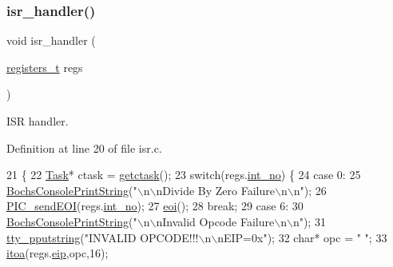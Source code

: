 \subsubsection{\texorpdfstring{isr\+\_\+handler()}{isr\_handler()}}
{\footnotesize\ttfamily void isr\+\_\+handler (\begin{DoxyParamCaption}\item[{\hyperlink{a00134_adf58dbaf6139b4957c348711f2026957_adf58dbaf6139b4957c348711f2026957}{registers\+\_\+t}}]{regs }\end{DoxyParamCaption})}



I\+SR handler. 



Definition at line 20 of file isr.\+c.


\begin{DoxyCode}
21 \{
22     \hyperlink{a00218}{Task}* ctask = \hyperlink{a00083_a5913e9b2190b2b4118ee020721a320e2_a5913e9b2190b2b4118ee020721a320e2}{getctask}();
23     \textcolor{keywordflow}{switch}(regs.\hyperlink{a00254_af311750a9b18afb3b1ed2d144fbe1cb0_af311750a9b18afb3b1ed2d144fbe1cb0}{int\_no}) \{
24         \textcolor{keywordflow}{case} 0:
25             \hyperlink{a00071_a19e1f554d03c977f8b947f21489daa41_a19e1f554d03c977f8b947f21489daa41}{BochsConsolePrintString}(\textcolor{stringliteral}{"\(\backslash\)n\(\backslash\)nDivide By Zero Failure\(\backslash\)n\(\backslash\)n"});
26             \hyperlink{a00044_a1119739f7932598c83c3f8ce42a649de_a1119739f7932598c83c3f8ce42a649de}{PIC\_sendEOI}(regs.\hyperlink{a00254_af311750a9b18afb3b1ed2d144fbe1cb0_af311750a9b18afb3b1ed2d144fbe1cb0}{int\_no});
27             \hyperlink{a00107_a4af3b3eec03921259f5db474506c0c8d_a4af3b3eec03921259f5db474506c0c8d}{eoi}();
28             \textcolor{keywordflow}{break};
29         \textcolor{keywordflow}{case} 6:
30             \hyperlink{a00071_a19e1f554d03c977f8b947f21489daa41_a19e1f554d03c977f8b947f21489daa41}{BochsConsolePrintString}(\textcolor{stringliteral}{"\(\backslash\)n\(\backslash\)nInvalid Opcode Failure\(\backslash\)n\(\backslash\)n"});
31             \hyperlink{a00173_ade960b1320324706aac6c00cc6b1b2fe_ade960b1320324706aac6c00cc6b1b2fe}{tty\_pputstring}(\textcolor{stringliteral}{"INVALID OPCODE!!!\(\backslash\)n\(\backslash\)nEIP=0x"});
32             \textcolor{keywordtype}{char}* opc = \textcolor{stringliteral}{"           "};
33             \hyperlink{a00119_ab42640268f26e065efd044cfe80591bd_ab42640268f26e065efd044cfe80591bd}{itoa}(regs.\hyperlink{a00254_aaeedf83509826a731e436025aeb53576_aaeedf83509826a731e436025aeb53576}{eip},opc,16);

\end{DoxyCode}
